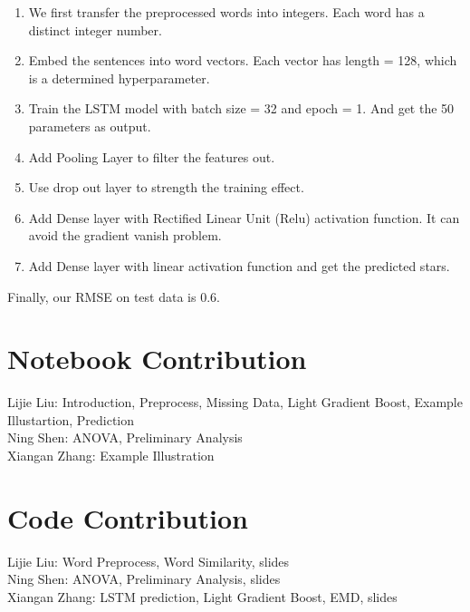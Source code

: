 \documentclass[11pt]{article}
\providecommand{\tightlist}{%
      \setlength{\itemsep}{0pt}\setlength{\parskip}{0pt}}
\begin{document}
\begin{enumerate}
\def\labelenumi{\arabic{enumi}.}
\tightlist
\item
  We first transfer the preprocessed words into integers. Each word has
  a distinct integer number.
\item
  Embed the sentences into word vectors. Each vector has length = 128,
  which is a determined hyperparameter.
\item
  Train the LSTM model with batch size = 32 and epoch = 1. And get the
  50 parameters as output.
\item
  Add Pooling Layer to filter the features out.
\item
  Use drop out layer to strength the training effect.
\item
  Add Dense layer with Rectified Linear Unit (Relu) activation function.
  It can avoid the gradient vanish problem.
\item
  Add Dense layer with linear activation function and get the predicted
  stars.
\end{enumerate}

Finally, our RMSE on test data is 0.6.

    \section{Notebook Contribution}\label{notebook-contribution}

Lijie Liu: Introduction, Preprocess, Missing Data, Light Gradient Boost,
Example Illustartion, Prediction\\
Ning Shen: ANOVA, Preliminary Analysis\\
Xiangan Zhang: Example Illustration

    \section{Code Contribution}\label{code-contribution}

Lijie Liu: Word Preprocess, Word Similarity, slides\\
Ning Shen: ANOVA, Preliminary Analysis, slides\\
Xiangan Zhang: LSTM prediction, Light Gradient Boost, EMD, slides


    
    
    
    
\end{document}

